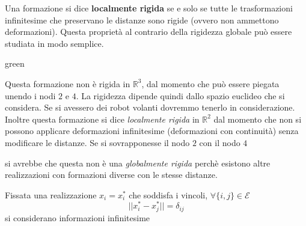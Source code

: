  Una formazione si dice \textbf{localmente rigida} se e solo se tutte le trasformazioni infinitesime che preservano le distanze sono rigide (ovvero non ammettono deformazioni). Questa propriet\`a al contrario della rigidezza globale pu\`o essere studiata in modo semplice.
\begin{mybox}[breakable]{green}{}
\begin{center}
\end{center}
Questa formazione non \`e rigida in $\mathbb{R}^3$, dal momento che pu\`o essere piegata unendo i nodi $2$ e $4$. La rigidezza dipende quindi dallo spazio euclideo che si considera. Se si avessero dei robot volanti dovremmo tenerlo in considerazione. Inoltre questa formazione si dice \textit{localmente rigida} in $\mathbb{R}^2$ dal momento che non si possono applicare deformazioni infinitesime (deformazioni con continuit\`a) senza modificare le distanze. Se si sovrapponesse il nodo $2$ con il nodo $4$
\begin{center}
\end{center}
si avrebbe che questa non \`e una \textit{globalmente rigida} perch\`e esistono altre realizzazioni con formazioni diverse con le stesse distanze.
\end{mybox}
Fissata una realizzazione $x_i = x_i^*$ che soddisfa i vincoli, $\forall \{i,j\} \in \mathcal{E}$
\begin{equation}
||x_i^* - x_j^*|| = \delta_{ij}
\end{equation} si considerano informazioni infinitesime
